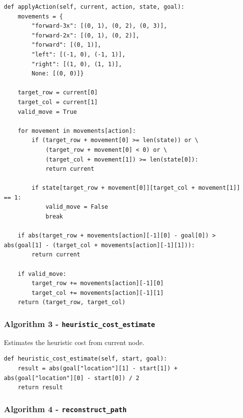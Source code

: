 \documentclass[12pt, letterpaper]{article}
\begin{document}
\begin{mdframed}[backgroundcolor=shadecolor]
\begin{verbatim}
def applyAction(self, current, action, state, goal):
    movements = {
        "forward-3x": [(0, 1), (0, 2), (0, 3)], 
        "forward-2x": [(0, 1), (0, 2)], 
        "forward": [(0, 1)], 
        "left": [(-1, 0), (-1, 1)], 
        "right": [(1, 0), (1, 1)], 
        None: [(0, 0)]}
    
    target_row = current[0]
    target_col = current[1]
    valid_move = True
    
    for movement in movements[action]:
        if (target_row + movement[0] >= len(state)) or \
            (target_row + movement[0] < 0) or \
            (target_col + movement[1]) >= len(state[0]):
            return current
                
        if state[target_row + movement[0]][target_col + movement[1]] == 1:
            valid_move = False
            break
        
    if abs(target_row + movements[action][-1][0] - goal[0]) > abs(goal[1] - (target_col + movements[action][-1][1])):
        return current
    
    if valid_move:
        target_row += movements[action][-1][0]
        target_col += movements[action][-1][1]
    return (target_row, target_col)
\end{verbatim}
\end{mdframed}

\subsubsection{Algorithm 3 - \texttt{heuristic\_cost\_estimate}}

Estimates the heuristic cost from current node.

\begin{mdframed}[backgroundcolor=shadecolor]
\begin{verbatim}
def heuristic_cost_estimate(self, start, goal):
    result = abs(goal["location"][1] - start[1]) + abs(goal["location"][0] - start[0]) / 2
    return result
\end{verbatim}
\end{mdframed}

\subsubsection{Algorithm 4 - \texttt{reconstruct\_path}}
\end{document}
